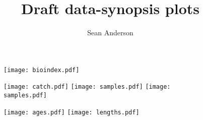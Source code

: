 \documentclass[12pt]{article}
\title{Draft data-synopsis plots}
\author{Sean Anderson}
\begin{document}




\textheight 26cm



% 

\begin{figure}[htp]
  \centering

  \parbox{\textwidth}{
    \parbox{2.5in}{%
         \texttt{[image: bioindex.pdf]}
    }
    \parbox{3in}{%
       \texttt{[image: catch.pdf]}
       \texttt{[image: samples.pdf]}
       \texttt{[image: samples.pdf]}
    }
  }



    \texttt{[image: ages.pdf]}
    \texttt{[image: lengths.pdf]}


\end{figure}

\end{document}
